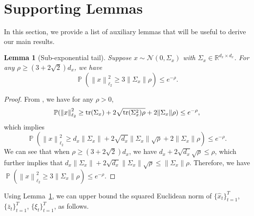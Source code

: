 \documentclass[11pt]{article}
\newtheorem{lemma}{Lemma}
\renewcommand{\cite}{\citep}
\newcommand{\zbar}{\bar{z}}
\newcommand{\xtil}{\hat{x}}
\newcommand{\Ncal}{\mathcal{N}}
\newcommand{\tn}[1]{\left\|{#1}\right\|_{\ell_2}}
\renewcommand{\P}{\operatorname{\mathbb{P}}}
\newcommand{\norm}[1]{\|{#1} \|}
\newcommand{\R}{\mathbb{R}}				%
\newcommand{\tr}{\textup{{tr}}} 			%
\newcommand{\<}{\langle}
\renewcommand{\>}{\rangle}
\renewcommand{\P}{\operatorname{\mathbb{P}}}
\numberwithin{equation}{section}
\begin{document}
\section{Supporting Lemmas}
In this section, we provide a list of auxiliary lemmas that will be useful to derive our main results.
\begin{lemma}[Sub-exponential tail]\label{lemma_GaussianTailBound}
	Suppose $x \sim \Ncal(0, \Sigma_x)$ with $\Sigma_x \in \R^{d_x \times d_x}$. For any $\rho \geq (3+ 2\sqrt{2}) d_x$, we have
	\begin{equation*}
		\P(\tn{x}^2 \geq 3 \norm{\Sigma_x} \rho) \leq e^{-\rho}.
	\end{equation*}
\end{lemma}
\begin{proof}
	From \cite[Proposition 1]{hsu2012tail}, we have for any $\rho>0$,
	\begin{equation*}
		\P(\tn{x}^2 \geq \tr(\Sigma_x) + 2 \sqrt{\tr(\Sigma_x^2) \rho} + 2 \norm{\Sigma_x} \rho) \leq e^{-\rho},
	\end{equation*}
	which implies
	\begin{equation*}
		\P(\tn{x}^2 \geq d_x \norm{\Sigma_x} + 2 \sqrt{d_x} \norm{\Sigma_x} \sqrt{\rho} + 2 \norm{\Sigma_x} \rho) \leq e^{-\rho}.
	\end{equation*}
	We can see that when $\rho \geq (3+2\sqrt{2}) d_x$, we have $d_x + 2 \sqrt{d_x} \sqrt{\rho} \leq \rho$, which further implies that $d_x \norm{\Sigma_x} + 2 \sqrt{d_x} \norm{\Sigma_x} \sqrt{\rho} \leq \norm{\Sigma_x} \rho$. Therefore, we have
	$
	\P(\tn{x}^2 \geq 3 \norm{\Sigma_x} \rho) \leq e^{-\rho}.
	$
\end{proof}
Using Lemma~\ref{lemma_GaussianTailBound}, we can upper bound the squared Euclidean norm of $\{\xtil_t\}_{t=1}^T$, $\{\zbar_t\}_{t=1}^T$, $\{\xi_t\}_{t=1}^T$, as follows.
\end{document}
